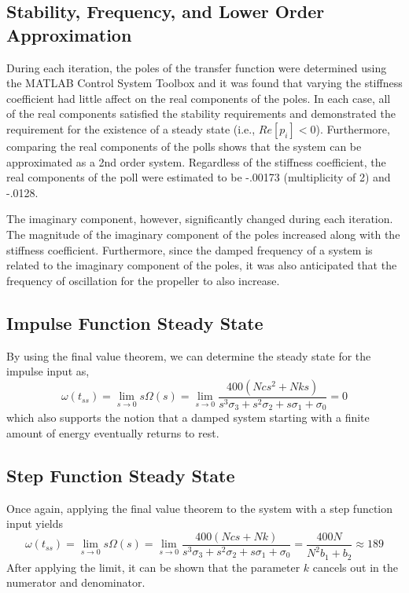 \documentclass[letterpaper,12pt]{article}
\begin{document}
\subsection{Stability, Frequency, and Lower Order Approximation}
During each iteration, the poles of the transfer function were determined using the MATLAB Control System Toolbox and it was found that varying the stiffness coefficient had little affect on the real components of the poles. In each case, all of the real components satisfied the stability requirements and demonstrated the requirement for the existence of a steady state (i.e., $Re[p_i] < 0$). Furthermore, comparing the real components of the polls shows that the system can be approximated as a 2nd order system. Regardless of the stiffness coefficient, the real components of the poll were estimated to be -.00173 (multiplicity of 2) and -.0128.

The imaginary component, however, significantly changed during each iteration. The magnitude of the imaginary component of the poles increased along with the stiffness coefficient. Furthermore, since the damped frequency of a system is related to the imaginary component of the poles, it was also anticipated that the frequency of oscillation for the propeller to also increase. 


\subsection{Impulse Function Steady State}
By using the final value theorem, we can determine the steady state for the impulse input as,
\begin{equation}
    \omega (t_{ss}) = \lim_{s\to 0} s\Omega(s) = \lim_{s\to 0} \frac{400(N c s^2+N k s)}{s^3\sigma_3 + s^2\sigma_2 + s\sigma_1 + \sigma_0} = 0
\end{equation}
which also supports the notion that a damped system starting with a finite amount of energy eventually returns to rest.

\subsection{Step Function Steady State}
Once again, applying the final value theorem to the system with a step function input yields
\begin{equation}
    \omega (t_{ss}) = \lim_{s\to 0} s\Omega(s) = \lim_{s\to 0} \frac{400(Ncs+Nk)}{s^3\sigma_3 + s^2\sigma_2 + s\sigma_1 + \sigma_0} = \frac{400N}{N^2b_1 + b_2} \approx 189
\end{equation}
After applying the limit, it can be shown that the parameter $k$ cancels out in the numerator and denominator.   
\end{document}
